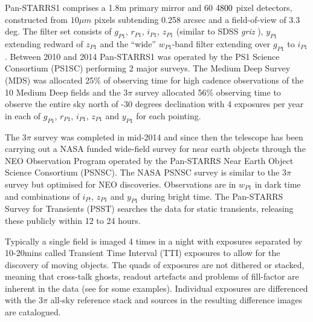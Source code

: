 \documentclass[a4paper,fleqn,usenatbib]{mnras}
\begin{document}


Pan-STARRS1 comprises a 1.8m primary mirror \citep{Kaiser10} and 60 $4800\time 4800$ pixel detectors, constructed from $10\mu m$ pixels subtending 0.258 arcsec \citep{Magnier13} and a field-of-view of 3.3 deg.  The filter set consists of $g_{P1}$, $r_{P1}$, $i_{P1}$, $z_{P1}$ (similar to SDSS \textit{griz} \citep{York00}), $y_{P1}$ extending
redward of $z_{P1}$ and the ``wide'' $w_{P1}$-band filter extending over $g_{P1}$ to $i_{P1}$ \citep{Tonry12b}.  Between 2010 and 2014 Pan-STARRS1 was operated by the PS1 Science Consortium (PS1SC) performing 2 major surveys.  The Medium Deep Survey (MDS) was allocated 25\% of observing time for high cadence observations of the 10 Medium Deep fields and the $3\pi$ survey allocated 56\% observing time to observe the entire sky north of -30 degrees declination with 4 exposures per year in each of $g_{P1}$, $r_{P1}$, $i_{P1}$, $z_{P1}$ and $y_{P1}$ for each pointing.

The $3\pi$ survey was completed in mid-2014 and since then the telescope has been carrying out a NASA funded wide-field survey for near earth objects through the NEO Observation Program operated by the Pan-STARRS Near Earth Object Science Consortium (PSNSC).  The NASA PSNSC survey is similar to the $3\pi$ survey but optimised for NEO discoveries.  Observations are in $w_{P1}$ in dark time and combinations of $i_{P!}$, $z_{P1}$ and $y_{P1}$ during bright time.  The Pan-STARRS Survey for Transients (PSST) \citep{Huber15a} searches the data for static transients, releasing these publicly within 12 to 24 hours.

Typically a single field is imaged 4 times in a night with exposures separated by 10-20mins called Transient Time Interval (TTI) exposures to allow for the discovery of moving objects.  The quads of exposures are not dithered or stacked, meaning that cross-talk ghosts, readout artefacts and problems of fill-factor are inherent in the data (see \citet{Denneau13} for some examples).  Individual exposures are differenced with the $3\pi$ all-sky reference stack and sources in the resulting difference images are catalogued.
\end{document}
